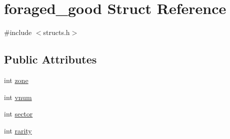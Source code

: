 \hypertarget{structforaged__good}{\section{foraged\-\_\-good Struct Reference}
\label{structforaged__good}
}


{\ttfamily \#include $<$structs.\-h$>$}

\subsection*{Public Attributes}
\begin{DoxyCompactItemize}
\item 
int \hyperlink{structforaged__good_a79e769df8c2d4b3c49e819bb92bdeb9d}{zone}
\item 
int \hyperlink{structforaged__good_a5bbeb8524fc3c9374aa117184cb22a83}{vnum}
\item 
int \hyperlink{structforaged__good_aba241a8d71a1882473ca9dbe08292501}{sector}
\item 
int \hyperlink{structforaged__good_a3e08c212f45ae6ff9c16282a9f197881}{rarity}
\end{DoxyCompactItemize}


